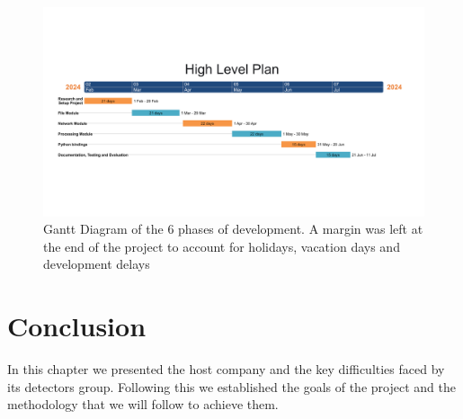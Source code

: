 \begin{spacing}{1.2}
    \begin{figure}[h]\centering
        \includegraphics[width=\textwidth]{Chapitre1/figures/gantt.png}
        \caption{Gantt Diagram of the 6 phases of development. A margin was left at the end of the project to account for 
        holidays, vacation days and development delays}
        \label{fig:gantt}
    \end{figure}

    \section*{Conclusion}
    In this chapter we presented the host company and the key difficulties faced 
    by its detectors group. Following this we established the goals of the project
    and the methodology that we will follow to achieve them. 


\end{spacing}

